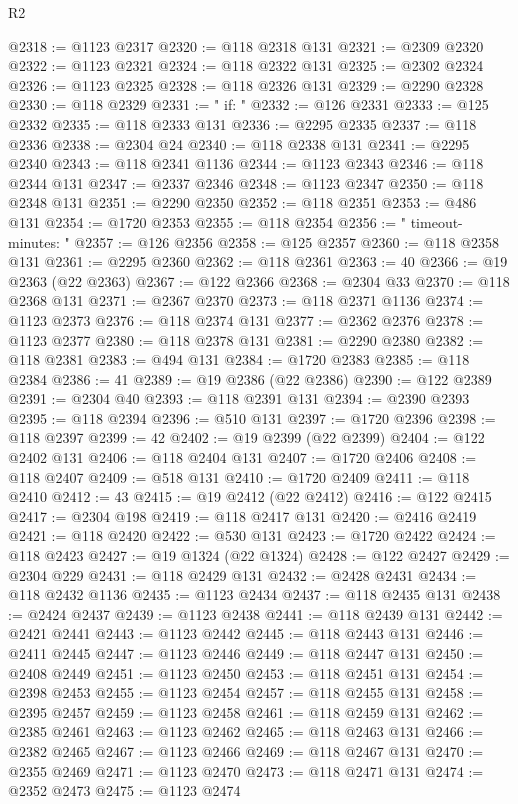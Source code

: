 \begin{lexlean}{R2}
\begin{coremodule}
@2318 := @1123 @2317
@2320 := @118 @2318 @131
@2321 := @2309 @2320
@2322 := @1123 @2321
@2324 := @118 @2322 @131
@2325 := @2302 @2324
@2326 := @1123 @2325
@2328 := @118 @2326 @131
@2329 := @2290 @2328
@2330 := @118 @2329
@2331 := "    if: "
@2332 := @126 @2331
@2333 := @125 @2332
@2335 := @118 @2333 @131
@2336 := @2295 @2335
@2337 := @118 @2336
@2338 := @2304 @24
@2340 := @118 @2338 @131
@2341 := @2295 @2340
@2343 := @118 @2341 @1136
@2344 := @1123 @2343
@2346 := @118 @2344 @131
@2347 := @2337 @2346
@2348 := @1123 @2347
@2350 := @118 @2348 @131
@2351 := @2290 @2350
@2352 := @118 @2351
@2353 := @486 @131
@2354 := @1720 @2353
@2355 := @118 @2354
@2356 := "    timeout-minutes: "
@2357 := @126 @2356
@2358 := @125 @2357
@2360 := @118 @2358 @131
@2361 := @2295 @2360
@2362 := @118 @2361
@2363 := 40
@2366 := @19 @2363 (@22 @2363)
@2367 := @122 @2366
@2368 := @2304 @33
@2370 := @118 @2368 @131
@2371 := @2367 @2370
@2373 := @118 @2371 @1136
@2374 := @1123 @2373
@2376 := @118 @2374 @131
@2377 := @2362 @2376
@2378 := @1123 @2377
@2380 := @118 @2378 @131
@2381 := @2290 @2380
@2382 := @118 @2381
@2383 := @494 @131
@2384 := @1720 @2383
@2385 := @118 @2384
@2386 := 41
@2389 := @19 @2386 (@22 @2386)
@2390 := @122 @2389
@2391 := @2304 @40
@2393 := @118 @2391 @131
@2394 := @2390 @2393
@2395 := @118 @2394
@2396 := @510 @131
@2397 := @1720 @2396
@2398 := @118 @2397
@2399 := 42
@2402 := @19 @2399 (@22 @2399)
@2404 := @122 @2402 @131
@2406 := @118 @2404 @131
@2407 := @1720 @2406
@2408 := @118 @2407
@2409 := @518 @131
@2410 := @1720 @2409
@2411 := @118 @2410
@2412 := 43
@2415 := @19 @2412 (@22 @2412)
@2416 := @122 @2415
@2417 := @2304 @198
@2419 := @118 @2417 @131
@2420 := @2416 @2419
@2421 := @118 @2420
@2422 := @530 @131
@2423 := @1720 @2422
@2424 := @118 @2423
@2427 := @19 @1324 (@22 @1324)
@2428 := @122 @2427
@2429 := @2304 @229
@2431 := @118 @2429 @131
@2432 := @2428 @2431
@2434 := @118 @2432 @1136
@2435 := @1123 @2434
@2437 := @118 @2435 @131
@2438 := @2424 @2437
@2439 := @1123 @2438
@2441 := @118 @2439 @131
@2442 := @2421 @2441
@2443 := @1123 @2442
@2445 := @118 @2443 @131
@2446 := @2411 @2445
@2447 := @1123 @2446
@2449 := @118 @2447 @131
@2450 := @2408 @2449
@2451 := @1123 @2450
@2453 := @118 @2451 @131
@2454 := @2398 @2453
@2455 := @1123 @2454
@2457 := @118 @2455 @131
@2458 := @2395 @2457
@2459 := @1123 @2458
@2461 := @118 @2459 @131
@2462 := @2385 @2461
@2463 := @1123 @2462
@2465 := @118 @2463 @131
@2466 := @2382 @2465
@2467 := @1123 @2466
@2469 := @118 @2467 @131
@2470 := @2355 @2469
@2471 := @1123 @2470
@2473 := @118 @2471 @131
@2474 := @2352 @2473
@2475 := @1123 @2474

\end{coremodule}
\end{lexlean}
